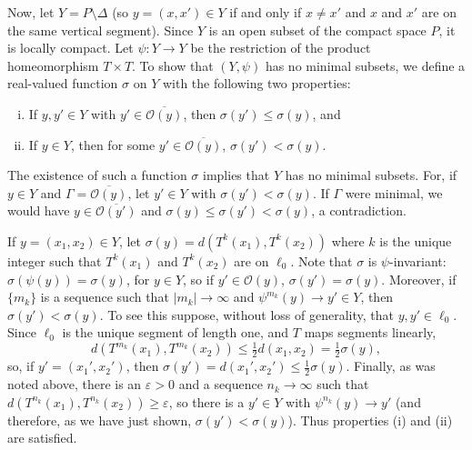 Now, let $Y = P \setminus \Delta$ (so $y = (x, x') \in Y$ if and only if $x \ne x'$ and $x$ and $x'$ are on the same vertical segment). Since $Y$ is an open subset of the compact space $P$, it is locally compact. Let $\psi : Y \to Y$ be the restriction of the product homeomorphism $T \times T$. To show that $(Y, \psi)$ has no minimal subsets, we define a real-valued function $\sigma$ on $Y$ with the following two properties:
\begin{enumerate}[(i)]
    \item If $y, y' \in Y$ with $y' \in \overline{\mathcal{O}(y)}$, then $\sigma(y') \le \sigma(y)$, and
    \item If $y \in Y$, then for some $y' \in \overline{\mathcal{O}(y)}$, $\sigma(y') < \sigma(y)$.
\end{enumerate}
The existence of such a function $\sigma$ implies that $Y$ has no minimal subsets. For, if $y \in Y$ and $\Gamma = \overline{\mathcal{O}(y)}$, let $y' \in Y$ with $\sigma(y') < \sigma(y)$. If $\Gamma$ were minimal, we would have $y \in \overline{\mathcal{O}(y')}$ and $\sigma(y) \le \sigma(y') < \sigma(y)$, a contradiction.


If $y = (x_1, x_2) \in Y$, let $\sigma(y) = d(T^k(x_1), T^k(x_2))$ where $k$ is the unique integer such that $T^k(x_1)$ and $T^k(x_2)$ are on $\ell_0$. Note that $\sigma$ is $\psi$-invariant: $\sigma(\psi(y)) = \sigma(y)$, for $y \in Y$, so if $y' \in \mathcal{O}(y)$, $\sigma(y') = \sigma(y)$. Moreover, if $\{m_k\}$ is a sequence such that $|m_k| \to \infty$ and $\psi^{m_k}(y) \to y' \in Y$, then $\sigma(y') < \sigma(y)$. To see this suppose, without loss of generality, that $y, y' \in \ell_0$. Since $\ell_0$ is the unique segment of length one, and $T$ maps segments linearly,
\[
    d(T^{m_k}(x_1), T^{m_k}(x_2)) \le \tfrac{1}{2} d(x_1, x_2) = \tfrac{1}{2} \sigma(y),
\]
so, if $y' = (x_1', x_2')$, then $\sigma(y') = d(x_1', x_2') \le \tfrac{1}{2} \sigma(y)$. Finally, as was noted above, there is an $\varepsilon > 0$ and a sequence $n_k \to \infty$ such that $d(T^{n_k}(x_1), T^{n_k}(x_2)) \ge \varepsilon$, so there is a $y' \in Y$ with $\psi^{n_k}(y) \to y'$ (and therefore, as we have just shown, $\sigma(y') < \sigma(y)$). Thus properties (i) and (ii) are satisfied.


